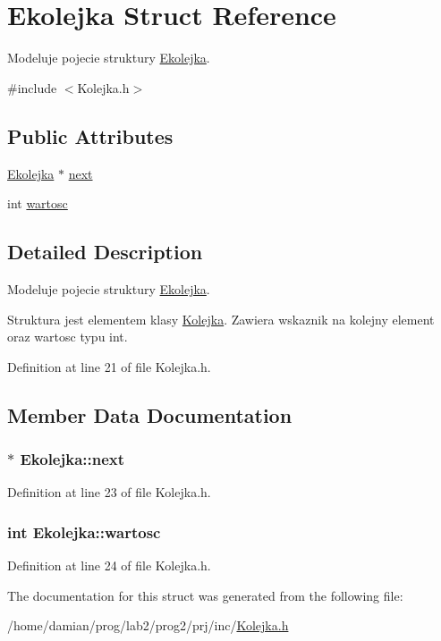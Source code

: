 \hypertarget{struct_ekolejka}{\section{Ekolejka Struct Reference}
\label{struct_ekolejka}
}


Modeluje pojecie struktury \hyperlink{struct_ekolejka}{Ekolejka}.  




{\ttfamily \#include $<$Kolejka.\-h$>$}

\subsection*{Public Attributes}
\begin{DoxyCompactItemize}
\item 
\hyperlink{struct_ekolejka}{Ekolejka} $\ast$ \hyperlink{struct_ekolejka_a0a6610e9d3ad4f4e416655922cf4f6f1}{next}
\item 
int \hyperlink{struct_ekolejka_a6b5e5dbb0edccd7ef18cf2ba30f6bacf}{wartosc}
\end{DoxyCompactItemize}


\subsection{Detailed Description}
Modeluje pojecie struktury \hyperlink{struct_ekolejka}{Ekolejka}. 

Struktura jest elementem klasy \hyperlink{class_kolejka}{Kolejka}. Zawiera wskaznik na kolejny element oraz wartosc typu int. 

Definition at line 21 of file Kolejka.\-h.



\subsection{Member Data Documentation}
\hypertarget{struct_ekolejka_a0a6610e9d3ad4f4e416655922cf4f6f1}{
\subsubsection[{next}]{$\ast$ Ekolejka\-::next}}\label{struct_ekolejka_a0a6610e9d3ad4f4e416655922cf4f6f1}


Definition at line 23 of file Kolejka.\-h.

\hypertarget{struct_ekolejka_a6b5e5dbb0edccd7ef18cf2ba30f6bacf}{
\subsubsection[{wartosc}]{\setlength{\rightskip}{0pt plus 5cm}int Ekolejka\-::wartosc}}\label{struct_ekolejka_a6b5e5dbb0edccd7ef18cf2ba30f6bacf}


Definition at line 24 of file Kolejka.\-h.



The documentation for this struct was generated from the following file\-:\begin{DoxyCompactItemize}
\item 
/home/damian/prog/lab2/prog2/prj/inc/\hyperlink{_kolejka_8h}{Kolejka.\-h}\end{DoxyCompactItemize}
